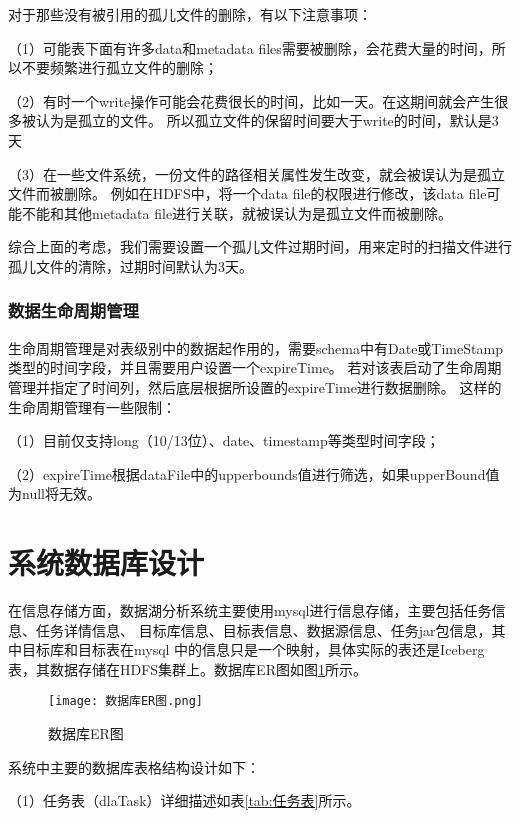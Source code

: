 对于那些没有被引用的孤儿文件的删除，有以下注意事项：

（1）可能表下面有许多data和metadata files需要被删除，会花费大量的时间，所以不要频繁进行孤立文件的删除；

（2）有时一个write操作可能会花费很长的时间，比如一天。在这期间就会产生很多被认为是孤立的文件。
所以孤立文件的保留时间要大于write的时间，默认是3天

（3）在一些文件系统，一份文件的路径相关属性发生改变，就会被误认为是孤立文件而被删除。
例如在HDFS中，将一个data file的权限进行修改，该data file可能不能和其他metadata file进行关联，就被误认为是孤立文件而被删除。

综合上面的考虑，我们需要设置一个孤儿文件过期时间，用来定时的扫描文件进行孤儿文件的清除，过期时间默认为3天。

\subsubsection{数据生命周期管理}

⽣命周期管理是对表级别中的数据起作用的，需要schema中有Date或TimeStamp类型的时间字段，并且需要用户设置一个expireTime。
若对该表启动了⽣命周期管理并指定了时间列，然后底层根据所设置的expireTime进⾏数据删除。
这样的⽣命周期管理有一些限制：

（1）⽬前仅⽀持long（10/13位）、date、timestamp等类型时间字段；

（2）expireTime根据dataFile中的upperbounds值进⾏筛选，如果upperBound值为null将⽆效。

\section{系统数据库设计}

在信息存储方面，数据湖分析系统主要使用mysql进行信息存储，主要包括任务信息、任务详情信息、
目标库信息、目标表信息、数据源信息、任务jar包信息，其中目标库和目标表在mysql
中的信息只是一个映射，具体实际的表还是Iceberg表，其数据存储在HDFS集群上。数据库ER图如图\ref{fig:数据库ER图}所示。

\begin{figure}[H]
  \centering
  \texttt{[image: 数据库ER图.png]}
  \caption{数据库ER图}
  \label{fig:数据库ER图}
\end{figure}

系统中主要的数据库表格结构设计如下：

（1）任务表（dlaTask）详细描述如表\ref{tab:任务表}所示。

